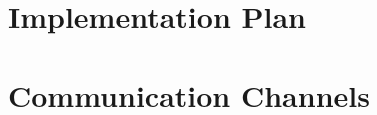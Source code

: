 \documentclass[a4paper]{article}
\begin{document}
	\section{Implementation Plan}
	
	\section{Communication Channels}
\end{document}
